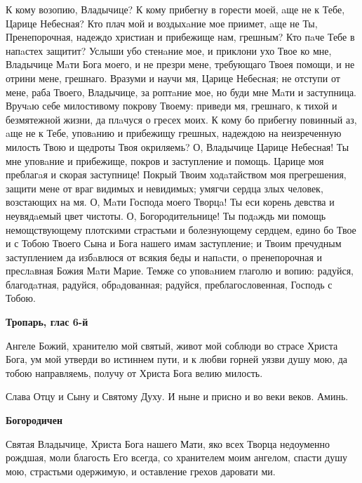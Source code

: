 К кому возопию, Владычице? К кому прибегну в горести моей, aще не к Тебе, Царице Небесная? Кто плач мой и воздыхaние мое приимет, aще не Ты, Пренепорочная, надеждо христиан и прибежище нам, грешным? Кто пaче Тебе в напaстех защитит? Услыши убо стенaние мое, и приклони ухо Твое ко мне, Владычице Мaти Бога моего, и не презри мене, требующаго Твоея помощи, и не отрини мене, грешнаго. Вразуми и научи мя, Царице Небесная; не отступи от мене, раба Твоего, Владычице, за роптaние мое, но буди мне Мaти и заступница. Вручaю себе милостивому покрову Твоему: приведи мя, грешнаго, к тихой и безмятежной жизни, да плaчуся о гресех моих. К кому бо прибегну повинный аз, aще не к Тебе, уповaнию и прибежищу грешных, надеждою на неизреченную милость Твою и щедроты Твоя окриляемь? О, Владычице Царице Небесная! Ты мне уповaние и прибежище, покров и заступление и помощь. Царице моя преблагaя и скорая заступнице! Покрый Твоим ходaтайством моя прегрешения, защити мене от враг видимых и невидимых; умягчи сердца злых человек, возстающих на мя. О, Мaти Господа моего Творцa! Ты еси корень девства и неувядaемый цвет чистоты. О, Богородительнице! Ты подaждь ми помощь немощствующему плотскими страстьми и болезнующему сердцем, едино бо Твое и с Тобою Твоего Сына и Бога нашего имам заступление; и Твоим пречудным заступлением да избaвлюся от всякия беды и напaсти, о пренепорочная и преслaвная Божия Мaти Марие. Темже со уповaнием глаголю и вопию: радуйся, благодaтная, радуйся, обрaдованная; радуйся, преблагословенная, Господь с Тобою.


\mychapterending







\bfseries Тропарь, глас 6-й\normalfont{}


Ангеле Божий, хранителю мой святый, живот мой соблюди во страсе Христа Бога, ум мой утверди во истиннем пути, и к любви горней уязви душу мою, да тобою направляемь, получу от Христа Бога велию милость.


Слава Отцу и Сыну и Святому Духу. И ныне и присно и во веки веков. Аминь.




\bfseries Богородичен\normalfont{}


Святая Владычице, Христа Бога нашего Мати, яко всех Творца недоуменно рождшая, моли благость Его всегда, со хранителем моим ангелом, спасти душу мою, страстьми одержимую, и оставление грехов даровати ми.




